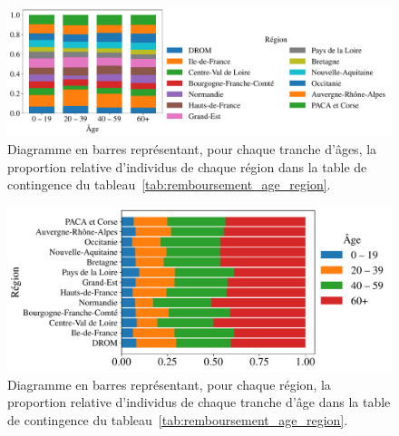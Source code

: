 \begin{figure}[h]
  \centering
  \includegraphics[width=\textwidth]{figures/stats/remboursement_age_region_lines}
  \caption{Diagramme en barres représentant, pour chaque tranche d'âges, la
    proportion relative d'individus de chaque région dans la table de
    contingence du tableau~\ref{tab:remboursement_age_region}.}
  \label{fig:remboursement_age_region_lines}
\end{figure}

\begin{figure}[h]
  \centering
  \includegraphics[width=\textwidth]{figures/stats/remboursement_age_region_cols}
  \caption{Diagramme en barres représentant, pour chaque région, la proportion
    relative d'individus de chaque tranche d'âge dans la table de contingence du
    tableau~\ref{tab:remboursement_age_region}.}
  \label{fig:remboursement_age_region_cols}
\end{figure}

\clearpage



